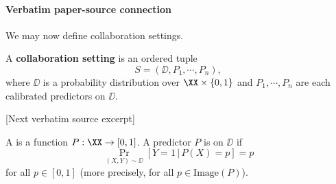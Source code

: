 \documentclass[10pt]{article}
\begin{document}
\paragraph{Verbatim paper-source connection}
\begin{ReviewVerbatim}
We may now define collaboration settings.
\begin{definition}A \textbf{collaboration setting} is an ordered tuple
\begin{equation}
    S=(\DD, P_1, \cdots, P_n),
\end{equation}
where $\DD$ is a probability distribution over $\XX\times \{0,1\}$ and $P_1,\cdots,P_n$ are each calibrated predictors on $\DD$.
\end{definition}

[Next verbatim source excerpt]

A  is a function $P: \XX\rightarrow [0,1]$. A predictor $P$ is  on $\DD$ if
\begin{equation}
    \Pr_{(X,Y)\sim \DD}[Y=1\,|\,P(X)=p] = p
\end{equation}
for all $p\in [0,1]$ (more precisely, for all $p\in \text{Image}(P)$).
\end{ReviewVerbatim}
\end{document}
